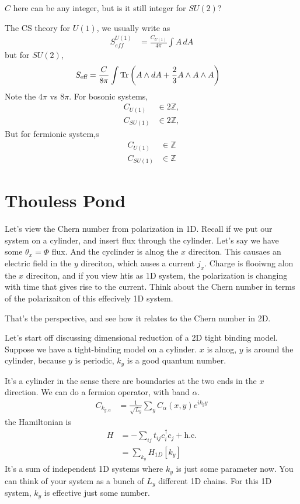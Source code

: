 \begin{question}
$C$ here can be any integer,
but is it still integer for $SU(2)$?
\end{question}
The CS theory for $U(1)$,
we usually write as
\begin{align}
    S_{eff}^{U(1)} &=
    \frac{C_{U(1)}}{4\pi}\int A\, dA
\end{align}
but for $SU(2)$,
\begin{align}
    S_{\text{eff}} &=
    \frac{C}{8\pi}
    \int \Tr\left( 
    A\wedge dA
    + \frac{2}{3} A \wedge A \wedge A
    \right)
\end{align}
Note the $4\pi$ vs $8\pi$.
For bosonic systems,
\begin{align}
    C_{U(1)} &\in 2\mathbb{Z},\\
    C_{SU(1)} &\in 2\mathbb{Z},
\end{align}
But for fermionic system,s
\begin{align}
    C_{U(1)} &\in \mathbb{Z}\\
    C_{SU(1)} &\in \mathbb{Z}
\end{align}

\section{Thouless Pond}
Let's view the Chern number from polarization in 1D.
Recall if we put our system on a cylinder,
and insert flux through the cylinder.
Let's say we have some $\theta_x = \Phi$ flux.
And the cyclinder is alnog the $x$ direciton.
This causaes an electric field in the $y$ direciton,
which auses a current $j_x$.
Charge is flooiwng alon the $x$ direciton,
and if you view htis as 1D system,
the polarization is changing with time that gives rise to the current.
Think about the Chern number in terms of the polarizaiton of this effecively 1D
system.

That's the perspective,
and see how it relates to the Chern number in 2D.

Let's start off discussing dimensional reduction of a 2D tight binding model.
Suppose we have a tight-binding model on a cylinder.
$x$ is alnog, $y$ is around the cylinder,
because $y$ is periodic, $k_y$ is a good quantum number.

It's a cylinder in the sense there are boundaries at the two ends
in the $x$ direction.
We can do a fermion operator,
with band $\alpha$.
\begin{align}
    C_{k_{y,\alpha}} &=
    \frac{1}{\sqrt{L_y}}
    \sum_y C_{\alpha}(x, y)
    e^{i k_y y}
\end{align}
the Hamiltonian is
\begin{align}
    H &= -\sum_{ij} t_{ij} c_i^\dagger c_j + \textrm{h.c.}\\
    &= \sum_{k_y} H_{1D}[k_y]
\end{align}
It's a sum of independent 1D systems where $k_y$ is just some parameter now.
You can think of your system as a bunch of $L_y$ different 1D chains.
For this 1D system,
$k_y$ is effective just some number.

